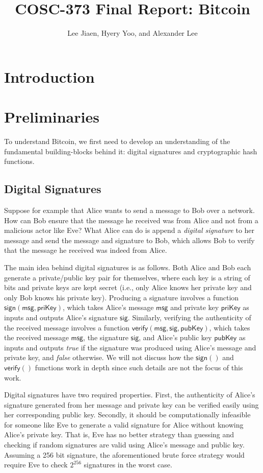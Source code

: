 \documentclass{article}
\title{COSC-373 Final Report: Bitcoin}
\author{Lee Jiaen, Hyery Yoo, and Alexander Lee}
\begin{document}
\maketitle

\section{Introduction}

\section{Preliminaries}

To understand Bitcoin, we first need to develop an understanding of the
fundamental building-blocks behind it: digital signatures and cryptographic hash
functions.

\subsection{Digital Signatures}

Suppose for example that Alice wants to send a message to Bob over a network.
How can Bob ensure that the message he received was from Alice and not from a
malicious actor like Eve? What Alice can do is append a \emph{digital signature}
to her message and send the message and signature to Bob, which allows Bob to
verify that the message he received was indeed from Alice.

The main idea behind digital signatures is as follows. Both Alice and Bob each
generate a private/public key pair for themselves, where each key is a string of
bits and private keys are kept secret (i.e., only Alice knows her private key
and only Bob knows his private key). Producing a signature involves a function
$\mathsf{sign(msg, priKey)}$, which takes Alice's message $\mathsf{msg}$ and
private key $\mathsf{priKey}$ as inputs and outputs Alice's signature
$\mathsf{sig}$. Similarly, verifying the authenticity of the received message
involves a function $\mathsf{verify(msg, sig, pubKey)}$, which takes the
received message $\mathsf{msg}$, the signature $\mathsf{sig}$, and Alice's
public key $\mathsf{pubKey}$ as inputs and outputs \emph{true} if the signature
was produced using Alice's message and private key, and \emph{false} otherwise.
We will not discuss how the $\mathsf{sign()}$ and $\mathsf{verify()}$ functions
work in depth since such details are not the focus of this work.

Digital signatures have two required properties. First, the authenticity of
Alice's signature generated from her message and private key can be verified
easily using her corresponding public key. Secondly, it should be
computationally infeasible for someone like Eve to generate a valid signature
for Alice without knowing Alice's private key. That is, Eve has no better
strategy than guessing and checking if random signatures are valid using Alice's
message and public key. Assuming a 256 bit signature, the aforementioned brute
force strategy would require Eve to check $2^{256}$ signatures in the worst
case.
\end{document}
